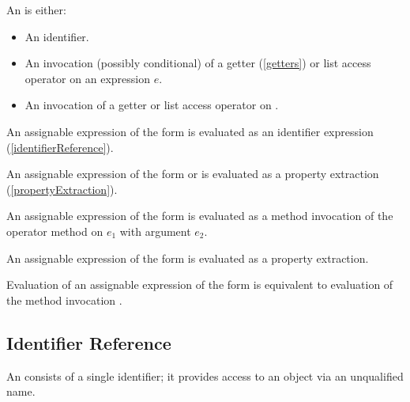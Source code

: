 \documentclass[makeidx]{article}
\begin{document}
\LMHash{}%
An  is either:
\begin{itemize}
\item An identifier.
\item An invocation (possibly conditional) of a getter (\ref{getters}) or list access operator on an expression $e$.
\item An invocation of a getter or list access operator on \SUPER{}.
\end{itemize}

\LMHash{}%
An assignable expression of the form \id{} is evaluated as an identifier expression (\ref{identifierReference}).


\LMHash{}%
An assignable expression of the form  or  is evaluated as a property extraction (\ref{propertyExtraction}).

\LMHash{}%
An assignable expression of the form  is evaluated as a method invocation of the operator method \code{[]} on $e_1$ with argument $e_2$.

\LMHash{}%
An assignable expression of the form  is evaluated as a property extraction.

\LMHash{}%
Evaluation of an assignable expression of the form \code{\SUPER{}[$e_2$]} is equivalent to evaluation of the method invocation .


\subsection{Identifier Reference}

\LMHash{}%
An  consists of a single identifier; it provides access to an object via an unqualified name.
\end{document}
